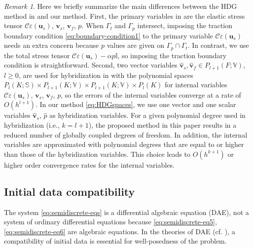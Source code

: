 \documentclass[10pt,letterpaper]{amsart}
\theoremstyle{plain} %
\theoremstyle{remark} %
\newtheorem{remark}[theorem]{Remark} %
\newcommand{\vect}[1]{\mathbf{#1}}
\newcommand{\Cel}{\mathcal{C}} %
\begin{document}
\begin{remark}
    \label{rmk:comparison}
	Here we briefly summarize the main differences between the HDG method in \cite{Meddahi-poroelastodynamic:2025} and our method. First, the primary variables in \cite{Meddahi-poroelastodynamic:2025} are the elastic stress tensor $\Cel \varepsilon(\vect{u}_s)$, $\vect{v}_s$, $\vect{v}_f$, $p$. When $\Gamma_t$ and $\Gamma_p$ intersect, imposing the traction boundary condition \eqref{eq:boundary-condition1} to the primary variable $\Cel \varepsilon(\vect{u}_s)$ needs an extra concern because $p$ values are given on $\Gamma_p \cap \Gamma_t$. In contrast, we use the total stress tensor $\Cel \varepsilon(\vect{u}_s) - \alpha p \mathbb{I}$, so imposing the traction boundary condition is straightforward. Second, two vector variables $\widehat{\vect{v}}_s, \widehat{\vect{v}}_f \in P_{l+1}(F; \mathbb{V})$, $l\ge 0$, are used for hybridization in \cite{Meddahi-poroelastodynamic:2025} with the polynomial spaces $P_l(K; \mathbb{S}) \times P_{l+1}(K; \mathbb{V}) \times P_{l+1}(K; \mathbb{V}) \times P_{l}(K)$ for internal variables $\Cel \varepsilon(\vect{u}_s)$, $\vect{v}_s$, $\vect{v}_f$, $p$, so the errors of the internal variables converge at a rate of $O(h^{l+1})$. In our method \eqref{eq:HDGspaces}, we use one vector and one scalar variables $\widehat{\vect{v}}_s$, $\widehat{p}$ as hybridization variables. For a given polynomial degree used in hybridization (i.e., $k=l+1$), the proposed method in this paper results in a reduced number of globally coupled degrees of freedom. In addition, the internal variables are approximated with polynomial degrees that are equal to or higher than those of the hybridization variables. This choice leads to $O(h^{k+1})$ or higher order convergence rates for the internal variables.
\end{remark}

\subsection{Initial data compatibility}\label{ss:initialdata}
The system \eqref{eq:semidiscrete-eqs} is a differential algebraic equation (DAE), not a system of ordinary differential equations because \eqref{eq:semidiscrete-eq5}, \eqref{eq:semidiscrete-eq6} are algebraic equations. In the theories of DAE (cf. \cite{Kunkel-Mehrmann:2006}), a compatibility of initial data is essential for well-posedness of the problem. 
\end{document}
